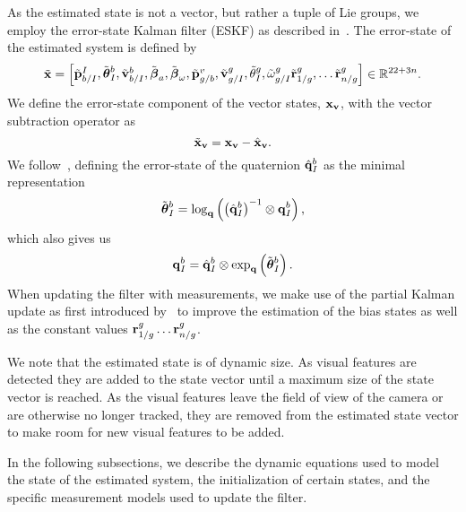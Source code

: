 As the estimated state is not a vector, but rather a tuple of Lie groups, we
employ the error-state Kalman filter (ESKF) as described in~\cite{koch2017relative}.
The error-state of the estimated system is defined by
\begin{equation*}
  \tilde{\boldsymbol{\mathrm{x}}} =
  \begin{bmatrix}
    \tilde{\boldsymbol{\mathrm{p}}}_{b/I}^{I}, \tilde{\boldsymbol{\mathrm{\theta}}}_I^{b}, \tilde{\boldsymbol{\mathrm{v}}}_{b/I}^b,
    \tilde{\boldsymbol{\mathrm{\beta}}}_a,
    \tilde{\boldsymbol{\mathrm{\beta}}}_{\omega},
    \tilde{\boldsymbol{\mathrm{p}}}_{g/b}^{v}, \tilde{\boldsymbol{\mathrm{v}}}_{g/I}^{g}, \tilde{\theta}_{I}^{g},
    \tilde{\omega}_{g/I}^{g}
      \tilde{\boldsymbol{\mathrm{r}}}_{1/g}^{g}, \dots \tilde{\boldsymbol{\mathrm{r}}}_{n/g}^{g}
  \end{bmatrix}
  \in \mathbb{R}^{22 + 3n}.
\end{equation*}
We define the error-state component of the vector states, $\boldsymbol{\mathrm{x}}_{\boldsymbol{\mathrm{v}}}$, with
the vector subtraction operator as
\begin{equation}
\tilde{\boldsymbol{\mathrm{x}}}_{\boldsymbol{\mathrm{v}}} = \boldsymbol{\mathrm{x}}_{\boldsymbol{\mathrm{v}}} - \hat{\boldsymbol{\mathrm{x}}}_{\boldsymbol{\mathrm{v}}}.
\end{equation}
We follow~\cite{koch2017relative}, defining the error-state of the quaternion
$\hat{\boldsymbol{\mathrm{q}}}_I^b$ as the minimal representation
\begin{equation}
  \tilde{\boldsymbol{\mathrm{\theta}}}_I^b = \log_{\boldsymbol{\mathrm{q}}} \left( \left( \hat{\boldsymbol{\mathrm{q}}}_I^b \right)^{-1}
  \otimes \boldsymbol{\mathrm{q}}_I^b \right),
\end{equation}
which also gives us
\begin{equation}
  \q_I^b  = \hat{\q}_I^b \otimes \exp_{\q} \left( \tilde{\vect{\theta}}_I^b
  \right).
  \label{eq:quat_true_state}
\end{equation}
When
updating the filter with measurements, we make use of the partial Kalman update
as first introduced by~\cite{brink2017partial} to improve the estimation of the
bias states as well as the constant values $\vect{r}_{1/g}^{g} \dots
\vect{r}_{n/g}^{g}$.

We note
that the estimated state is of dynamic size. As visual features are
detected they are added to the state vector until a maximum size of the state
vector is reached. As the visual features leave the field of view of the camera
or are otherwise no longer tracked, they are removed from the estimated state
vector to make room for new visual features to be added.

In the following
subsections, we describe the dynamic equations used to model the state of the
estimated system, the
initialization of certain states, and the specific
measurement models used to update the filter.
